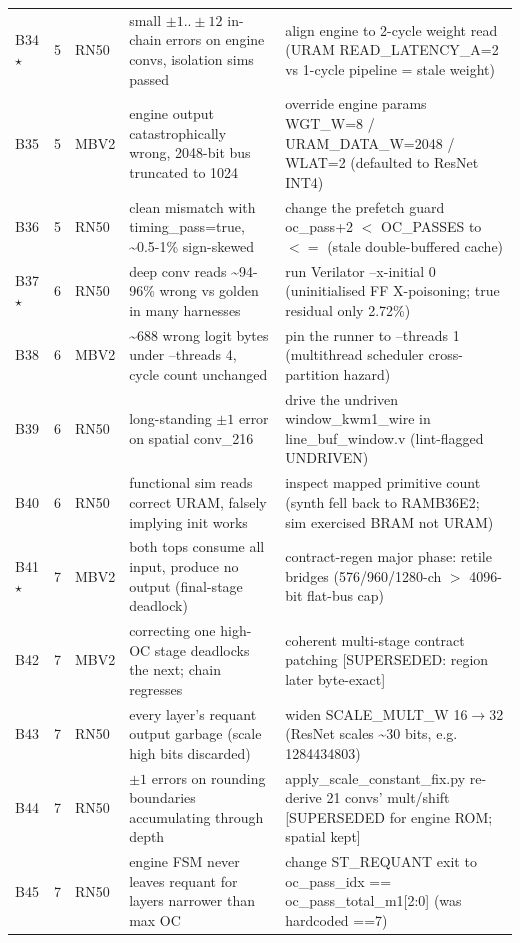 \documentclass[acmtog,authorversion]{acmart}
\begin{document}
\begin{longtable}{@{}l l l p{} p{}@{}}
B34 $\star$ & 5 & RN50 & small $\pm1..\pm12$ in-chain errors on engine convs, isolation sims passed & align engine to 2-cycle weight read (URAM READ\_LATENCY\_A=2 vs 1-cycle pipeline = stale weight) \\
B35 & 5 & MBV2 & engine output catastrophically wrong, 2048-bit bus truncated to 1024 & override engine params WGT\_W=8 / URAM\_DATA\_W=2048 / WLAT=2 (defaulted to ResNet INT4) \\
B36 & 5 & RN50 & clean mismatch with timing\_pass=true, \textasciitilde{}0.5-1\% sign-skewed & change the prefetch guard oc\_pass+2 $<$ OC\_PASSES to $<=$ (stale double-buffered cache) \\
B37 $\star$ & 6 & RN50 & deep conv reads \textasciitilde{}94-96\% wrong vs golden in many harnesses & run Verilator --x-initial 0 (uninitialised FF X-poisoning; true residual only 2.72\%) \\
B38 & 6 & MBV2 & \textasciitilde{}688 wrong logit bytes under --threads 4, cycle count unchanged & pin the runner to --threads 1 (multithread scheduler cross-partition hazard) \\
B39 & 6 & RN50 & long-standing $\pm1$ error on spatial conv\_216 & drive the undriven window\_kwm1\_wire in line\_buf\_window.v (lint-flagged UNDRIVEN) \\
B40 & 6 & RN50 & functional sim reads correct URAM, falsely implying init works & inspect mapped primitive count (synth fell back to RAMB36E2; sim exercised BRAM not URAM) \\
B41 $\star$ & 7 & MBV2 & both tops consume all input, produce no output (final-stage deadlock) & contract-regen major phase: retile bridges (576/960/1280-ch $>$ 4096-bit flat-bus cap) \\
B42 & 7 & MBV2 & correcting one high-OC stage deadlocks the next; chain regresses & coherent multi-stage contract patching [SUPERSEDED: region later byte-exact] \\
B43 & 7 & RN50 & every layer's requant output garbage (scale high bits discarded) & widen SCALE\_MULT\_W 16$\rightarrow$32 (ResNet scales \textasciitilde{}30 bits, e.g. 1284434803) \\
B44 & 7 & RN50 & $\pm1$ errors on rounding boundaries accumulating through depth & apply\_scale\_constant\_fix.py re-derive 21 convs' mult/shift [SUPERSEDED for engine ROM; spatial kept] \\
B45 & 7 & RN50 & engine FSM never leaves requant for layers narrower than max OC & change ST\_REQUANT exit to oc\_pass\_idx == oc\_pass\_total\_m1[2:0] (was hardcoded ==7) \\

\end{longtable}
\end{document}

